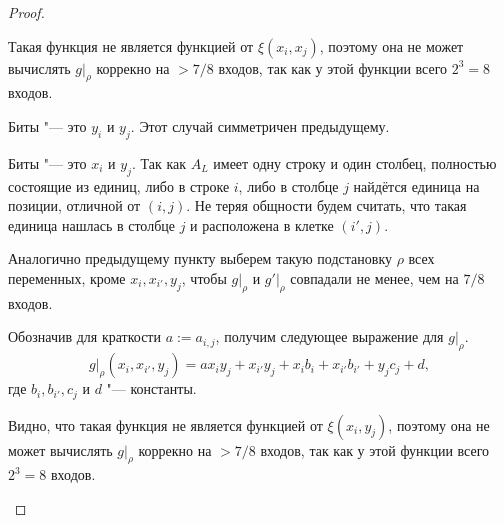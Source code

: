 \documentclass[oneside, a4paper]{article}
\theoremstyle{plain}
\theoremstyle{remark}
\begin{document}
\begin{proof}
\begin{description}
Такая функция не является функцией от $\xi(x_i, x_j)$, поэтому она не может
вычислять $g \rvert _ \rho$ коррекно на $> 7/8$ входов, так как у этой функции
всего $2^3 = 8$ входов.


\item{Биты "--- это $y_i$ и $y_j$.} Этот случай симметричен предыдущему.
\item{Биты "--- это $x_i$ и $y_j$.} Так как $A_L$ имеет одну строку и один
столбец, полностью состоящие из единиц, либо в строке $i$, либо в столбце $j$
найдётся единица на позиции, отличной от $(i, j)$. Не теряя общности будем
считать, что такая единица нашлась в столбце $j$ и расположена в клетке $(i',
j)$.

Аналогично предыдущему пункту выберем такую подстановку $\rho$ всех переменных,
кроме $x_i, x_{i'}, y_j$, чтобы $g \rvert _ \rho$ и $g' \rvert _ \rho$ совпадали
не менее, чем на $7/8$ входов.

Обозначив для краткости $a := a_{i, j}$, получим следующее выражение для $g
\rvert _ \rho$.
\[
g \rvert _ \rho (x_i, x_{i'}, y_j) = a x_i y_j + x_{i'} y_j + x_i b_i + x_{i'} b_{i'} + y_j c_j + d,
\]
где $b_{i}, b_{i'}, c_j$ и $d$ "--- константы.

Видно, что такая функция не является функцией от $\xi(x_i, y_j)$, поэтому она не
может вычислять $g \rvert _ \rho$ коррекно на $> 7/8$ входов, так как у этой
функции всего $2^3 = 8$ входов.
\end{description}
\end{proof}
\end{document}
